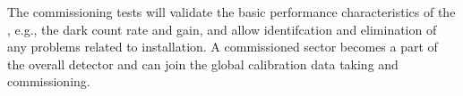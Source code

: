The commissioning tests will validate the basic performance characteristics of the , e.g., the dark count rate and gain, and allow identifcation and elimination of %
any problems related to installation. %
A commissioned sector becomes a part of the overall detector and can join the global calibration data taking and commissioning.


